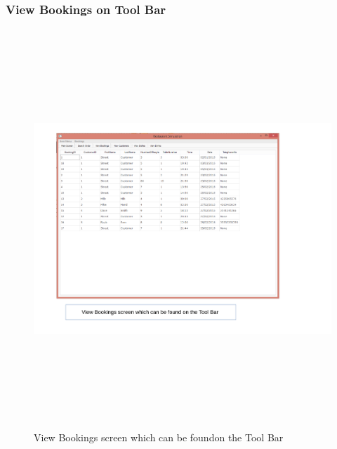\begin{landscape}
\subsubsection{View Bookings on Tool Bar}
\begin{figure}[H]
    \includegraphics[height = 15cm]{./Maintenance/images/screen18}
    \caption{View Bookings screen which can be foundon the Tool Bar} \label{fig:screen18}
\end{figure}


\end{landscape}
